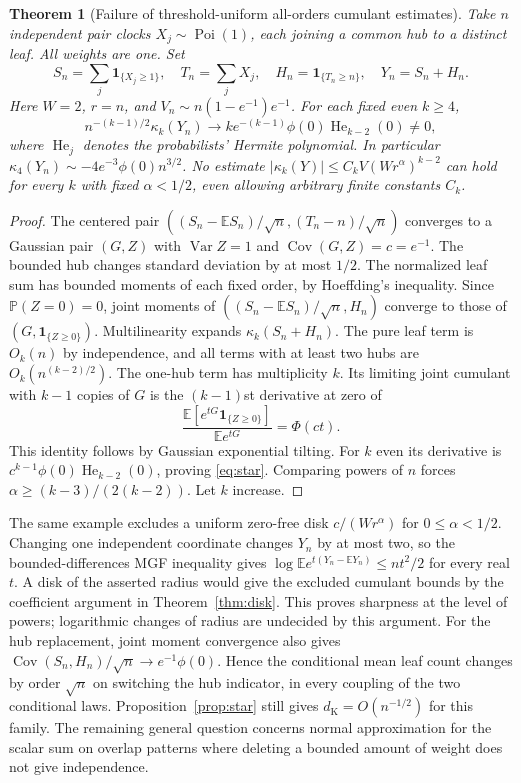 \documentclass[11pt]{article}
\newtheorem{theorem}{Theorem}[section]
\newcommand{\E}{\mathbb E}
\newcommand{\Prb}{\mathbb P}
\newcommand{\Var}{\operatorname{Var}}
\newcommand{\Cov}{\operatorname{Cov}}
\newcommand{\Poi}{\operatorname{Poi}}
\newcommand{\ind}{\mathbf1}
\newcommand{\dK}{d_{\mathrm K}}
\newcommand{\kk}{\kappa}
\numberwithin{equation}{section}
\begin{document}
\begin{theorem}[Failure of threshold-uniform all-orders cumulant estimates]\label{thm:star}
Take $n$ independent pair clocks $X_j\sim\Poi(1)$, each joining a common hub to a
distinct leaf. All weights are one. Set
\[
 S_n=\sum_j\ind_{\{X_j\ge1\}},\quad T_n=\sum_jX_j,\quad
 H_n=\ind_{\{T_n\ge n\}},\quad Y_n=S_n+H_n .
\]
Here $W=2$, $r=n$, and $V_n\sim n(1-e^{-1})e^{-1}$. For each fixed even $k\ge4$,
\begin{equation}\label{eq:star}
 n^{-(k-1)/2}\kk_k(Y_n)\longrightarrow
 k e^{-(k-1)}\phi(0)\operatorname{He}_{k-2}(0)\ne0 ,
\end{equation}
where $\operatorname{He}_j$ denotes the probabilists' Hermite polynomial.
In particular $\kk_4(Y_n)\sim-4 e^{-3}\phi(0)n^{3/2}$.
No estimate $|\kk_k(Y)|\le C_k V(Wr^\alpha)^{k-2}$ can hold for every $k$
with fixed $\alpha<1/2$, even allowing arbitrary finite constants $C_k$.
\end{theorem}
\begin{proof}
The centered pair $((S_n-\E S_n)/\sqrt n,(T_n-n)/\sqrt n)$ converges to a
Gaussian pair $(G,Z)$ with $\Var Z=1$ and $\Cov(G,Z)=c=e^{-1}$.
The bounded hub changes standard deviation by at most $1/2$.
The normalized leaf sum has bounded moments of each fixed order, by
Hoeffding's inequality. Since $\Prb(Z=0)=0$, joint moments of
$((S_n-\E S_n)/\sqrt n,H_n)$ converge to those of $(G,\ind_{\{Z\ge0\}})$.
Multilinearity expands $\kk_k(S_n+H_n)$. The pure leaf term is $O_k(n)$ by
independence, and all terms with at least two hubs are $O_k(n^{(k-2)/2})$.
The one-hub term has multiplicity $k$. Its limiting joint cumulant with $k-1$
copies of $G$ is the $(k-1)$st derivative at zero of
\[
 \frac{\E[e^{tG}\ind_{\{Z\ge0\}}]}{\E e^{tG}}=\Phi(ct).
\]
This identity follows by Gaussian exponential tilting. For $k$ even its
derivative is $c^{k-1}\phi(0)\operatorname{He}_{k-2}(0)$, proving \eqref{eq:star}.
Comparing powers of $n$ forces $\alpha\ge(k-3)/(2(k-2))$. Let $k$ increase.
\end{proof}
The same example excludes a uniform zero-free disk $c/(Wr^\alpha)$ for
$0\le\alpha<1/2$. Changing one independent coordinate changes $Y_n$ by at most two,
so the bounded-differences MGF inequality gives
$\log\E e^{t(Y_n-\E Y_n)}\le nt^2/2$ for every real $t$.
A disk of the asserted radius would give the excluded cumulant bounds by the
coefficient argument in Theorem~\ref{thm:disk}. This proves sharpness at the
level of powers; logarithmic changes of radius are undecided by this argument.
For the hub replacement, joint moment convergence also gives
$\Cov(S_n,H_n)/\sqrt n\to e^{-1}\phi(0)$.
Hence the conditional mean leaf count changes by order $\sqrt n$ on switching
the hub indicator, in every coupling of the two conditional laws.
Proposition~\ref{prop:star} still gives $\dK=O(n^{-1/2})$ for this family.
The remaining general question concerns normal approximation for the scalar sum on overlap
patterns where deleting a bounded amount of weight does not give independence.
\end{document}
